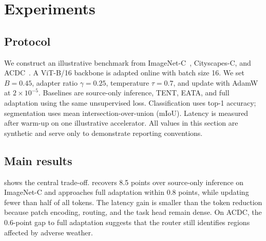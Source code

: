 \section{Experiments}
\label{sec:experiments}

\subsection{Protocol}

We construct an illustrative benchmark from ImageNet-C~\citep{hendrycks2019robustness},
Cityscapes-C, and ACDC~\citep{sakaridis2021acdc}.  A ViT-B/16 backbone is
adapted online with batch size 16.  We set $B=0.45$, adapter ratio
$\gamma=0.25$, temperature $\tau=0.7$, and update with AdamW at
$2\times10^{-5}$.  Baselines are source-only inference, TENT, EATA, and full
adaptation using the same unsupervised loss.  Classification uses top-1
accuracy; segmentation uses mean intersection-over-union (mIoU).  Latency is
measured after warm-up on one illustrative accelerator.  All values in this
section are synthetic and serve only to demonstrate reporting conventions.

\begin{table}[t]
  \centering
  \caption{Illustrative accuracy and efficiency.  Higher accuracy/mIoU is
  better; lower latency is better.  Best values are bold.}
  \label{tab:main}
\end{table}

\subsection{Main results}

 shows the central trade-off.  \method{} recovers 8.5 points
over source-only inference on ImageNet-C and approaches full adaptation within
0.8 points, while updating fewer than half of all tokens.  The latency gain is
smaller than the token reduction because patch encoding, routing, and the task
head remain dense.  On ACDC, the 0.6-point gap to full adaptation suggests that
the router still identifies regions affected by adverse weather.

